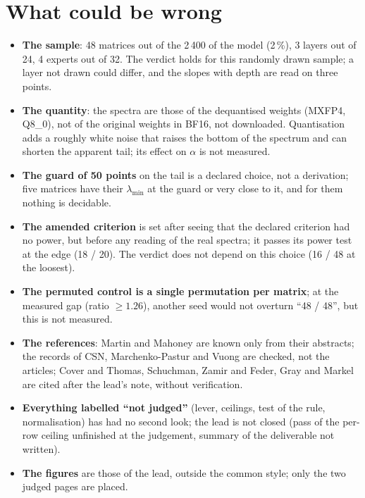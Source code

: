 \section{What could be wrong}\label{t3spe:sec:faux}

\begin{faux}
\begin{itemize}
\item \textbf{The sample}: 48 matrices out of the 2\,400 of the model (2\,\%), 3 layers out of 24, 4 experts out of 32. The verdict holds for this randomly drawn sample; a layer not drawn could differ, and the slopes with depth are read on three points.
\item \textbf{The quantity}: the spectra are those of the dequantised weights (MXFP4, Q8\_0), not of the original weights in BF16, not downloaded. Quantisation adds a roughly white noise that raises the bottom of the spectrum and can shorten the apparent tail; its effect on $\alpha$ is not measured.
\item \textbf{The guard of 50 points} on the tail is a declared choice, not a derivation; five matrices have their $\lambda_{\min}$ at the guard or very close to it, and for them nothing is decidable.
\item \textbf{The amended criterion} is set after seeing that the declared criterion had no power, but before any reading of the real spectra; it passes its power test at the edge (18 / 20). The verdict does not depend on this choice (16 / 48 at the loosest).
\item \textbf{The permuted control is a single permutation per matrix}; at the measured gap (ratio $\ge 1.26$), another seed would not overturn ``48 / 48'', but this is not measured.
\item \textbf{The references}: Martin and Mahoney are known only from their abstracts; the records of CSN, Marchenko-Pastur and Vuong are checked, not the articles; Cover and Thomas, Schuchman, Zamir and Feder, Gray and Markel are cited after the lead's note, without verification.
\item \textbf{Everything labelled ``not judged''} (lever, ceilings, test of the rule, normalisation) has had no second look; the lead is not closed (pass of the per-row ceiling unfinished at the judgement, summary of the deliverable not written).
\item \textbf{The figures} are those of the lead, outside the common style; only the two judged pages are placed.
\end{itemize}
\end{faux}
